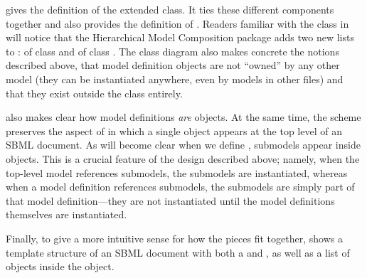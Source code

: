  gives the definition of the extended \SBML
class. It ties these different components together and also provides the
definition of \ExternalModelDefinition.  Readers familiar with the \SBML
class in \sbmlthreecore will notice that the Hierarchical Model
Composition package adds two new lists to \SBML:
 of class \ListOfModelDefinitions and
 of class
\ListOfExternalModelDefinitions.  The class diagram also makes concrete
the notions described above, that model definition objects are not
``owned'' by any other model (they can be instantiated anywhere, even by
models in other files) and that they exist outside the \Model class
entirely.

 also makes clear how model definitions
\emph{are} \Model objects.  At the same time, the scheme preserves the
aspect of \sbmlthreecore in which a single \Model object appears at the
top level of an SBML document.  As will become clear when we define
\Model, submodels appear inside \Model objects.  This is a crucial
feature of the design described above; namely, when the top-level model
references submodels, the submodels are instantiated, whereas when a
model definition references submodels, the submodels are simply part of
that model definition---they are not instantiated until the model
definitions themselves are instantiated.

Finally, to give a more intuitive sense for how the pieces fit together,
 shows a template structure of an SBML document
with both a  and
, as well as a list of \Submodel
objects inside the \Model object.

\newcommand{\sayOptional}{\raisebox{0pt}[0pt][0pt]{\bigg\} \textrm{\emph{optional}}}}

